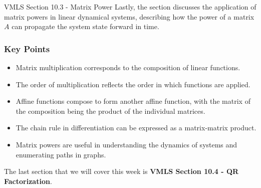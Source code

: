 \begin{notes}{VMLS Section 10.3 - Matrix Power}
    Lastly, the section discusses the application of matrix powers in linear dynamical systems, describing how the power of a matrix $A$ can propagate the system state forward in time. \vspace*{1em}
    
    \subsubsection*{Key Points}
    \begin{itemize}
        \item Matrix multiplication corresponds to the composition of linear functions.
        \item The order of multiplication reflects the order in which functions are applied.
        \item Affine functions compose to form another affine function, with the matrix of the composition being the product of the individual matrices.
        \item The chain rule in differentiation can be expressed as a matrix-matrix product.
        \item Matrix powers are useful in understanding the dynamics of systems and enumerating paths in graphs.
    \end{itemize}    
\end{notes}

The last section that we will cover this week is \textbf{VMLS Section 10.4 - QR Factorization}.

